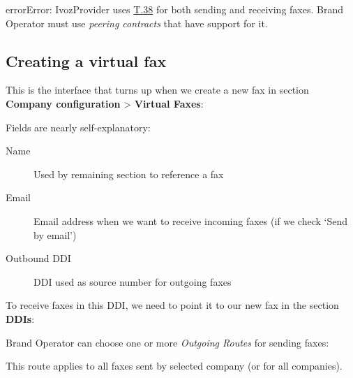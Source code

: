 \documentclass[letterpaper,10pt,english]{sphinxmanual}
\begin{document}
\begin{notice}{error}{Error:}
IvozProvider uses
\href{http://www.voip-info.org/wiki/view/T.38}{T.38} for both sending and receiving
faxes. Brand Operator must use \emph{peering contracts} that have support for it.
\end{notice}


\subsection{Creating a virtual fax}
\label{company/faxing:creating-a-virtual-fax}
This is the interface that turns up when we create a new fax in section
\textbf{Company configuration} \textgreater{} \textbf{Virtual Faxes}:


Fields are nearly self-explanatory:
\begin{description}
\item[{Name}] \leavevmode{}\label{company/faxing:term-name}
Used by remaining section to reference a fax

\item[{Email}] \leavevmode{}\label{company/faxing:term-email}
Email address when we want to receive incoming faxes (if we check `Send
by email')

\item[{Outbound DDI}] \leavevmode{}\label{company/faxing:term-outbound-ddi}
DDI used as source number for outgoing faxes

\end{description}

To receive faxes in this DDI, we need to point it to our new fax in the section
\textbf{DDIs}:


Brand Operator can choose one or more \emph{Outgoing Routes} for sending faxes:


This route applies to all faxes sent by selected company (or for all companies).
\end{document}
